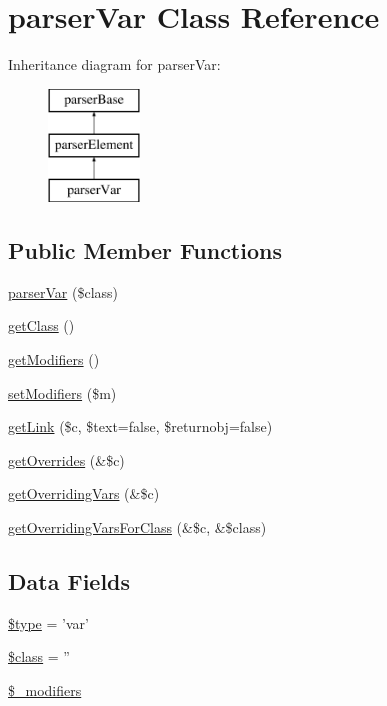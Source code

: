 \hypertarget{classparser_var}{\section{parser\-Var \-Class \-Reference}
\label{classparser_var}
}
\-Inheritance diagram for parser\-Var\-:\begin{figure}[H]
\begin{center}
\leavevmode
\includegraphics[height=3.000000cm]{classparser_var}
\end{center}
\end{figure}
\subsection*{\-Public \-Member \-Functions}
\begin{DoxyCompactItemize}
\item 
\hyperlink{classparser_var_a4761f9611335f086c3414f13d1edecb5}{parser\-Var} (\$class)
\item 
\hyperlink{classparser_var_a23ecbde357f7f6bde5a50f876334a74d}{get\-Class} ()
\item 
\hyperlink{classparser_var_a781d75979d7792ce3e5e4dcf79a623c9}{get\-Modifiers} ()
\item 
\hyperlink{classparser_var_aaf5a37db0e5ff1e3deb9a3c575b325f6}{set\-Modifiers} (\$m)
\item 
\hyperlink{classparser_var_a06461a82056b3b599f7011fdf0840877}{get\-Link} (\$c, \$text=false, \$returnobj=false)
\item 
\hyperlink{classparser_var_aae48ba0a23cdf3199b2a7d4eecd0eed3}{get\-Overrides} (\&\$c)
\item 
\hyperlink{classparser_var_a2661517c71fa6dca0685f954be31fc49}{get\-Overriding\-Vars} (\&\$c)
\item 
\hyperlink{classparser_var_ad362f69e7a5259d51d73b194e81ac5ea}{get\-Overriding\-Vars\-For\-Class} (\&\$c, \&\$class)
\end{DoxyCompactItemize}
\subsection*{\-Data \-Fields}
\begin{DoxyCompactItemize}
\item 
\hyperlink{classparser_var_a9a4a6fba2208984cabb3afacadf33919}{\$type} = 'var'
\item 
\hyperlink{classparser_var_a252ba022809910ea710a068fc1bab657}{\$class} = ''
\item 
\hyperlink{classparser_var_aa01f7445669441074fc2d6ccd08eb4a1}{\$\-\_\-modifiers}
\end{DoxyCompactItemize}


